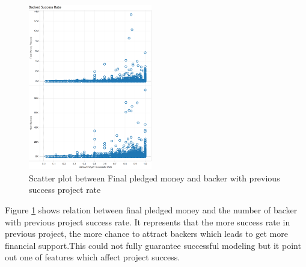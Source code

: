 \begin{figure}[!ht]
\centering
  \includegraphics[width=0.48\textwidth]{figs/successfulrate}
    \caption{Scatter plot between Final pledged money and backer with previous success project rate}
  \label{fig:scatterSuccessRate}
\end{figure}

Figure \ref{fig:scatterSuccessRate} shows relation between final pledged money and the number of backer with previous project success rate. It represents that the more success rate in previous project, the more chance to attract backers which leads to get more financial support.This could not fully guarantee successful modeling but it point out one of features which affect project success.

